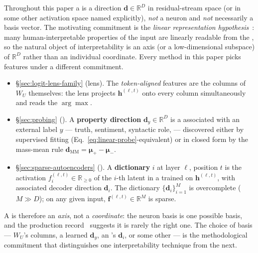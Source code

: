 Throughout this paper a \textbf{} is a direction
$\mathbf{d} \in \mathbb{R}^D$ in residual-stream space (or in some
other activation space named explicitly), \emph{not} a neuron and
\emph{not} necessarily a basis vector. The motivating commitment is
the \emph{linear representation hypothesis}~: many
human-interpretable properties of the input are linearly readable
from the , so the natural object of interpretability
is an axis (or a low-dimensional subspace) of $\mathbb{R}^D$ rather
than an individual coordinate. Every method in this paper picks
features under a different commitment.
\begin{itemize}
  \item \S\ref{sec:logit-lens-family} (lens). The \emph{token-aligned}
    features are the columns of $W_U$ themselves: the lens projects
    $\mathbf{h}^{(\ell, t)}$ onto every column simultaneously and
    reads the $\arg\max$.
  \item \S\ref{sec:probing} (). A \textbf{property direction}
    $\mathbf{d}_y \in \mathbb{R}^D$ is a  associated with an
    external label $y$ --- truth, sentiment, syntactic role,
     --- discovered either by supervised fitting
    (Eq.~\eqref{eq:linear-probe}-equivalent) or in closed form by the
    mass-mean rule
    $\mathbf{d}_{\mathrm{MM}} = \boldsymbol{\mu}_+ - \boldsymbol{\mu}_-$.
  \item \S\ref{sec:sparse-autoencoders} (). A \textbf{dictionary
    } $i$ at layer $\ell$, position $t$ is the activation
    $f_i^{(\ell, t)} \in \mathbb{R}_{\geq 0}$ of the $i$-th latent in
    a  trained on $\mathbf{h}^{(\ell, t)}$, with
    associated decoder direction $\mathbf{d}_i$. The dictionary
    $\{\mathbf{d}_i\}_{i=1}^M$ is overcomplete ($M \gg D$); on any
    given input, $\mathbf{f}^{(\ell, t)} \in \mathbb{R}^M$ is sparse.
\end{itemize}
A  is therefore an \emph{axis}, not a \emph{coordinate}: the
neuron basis is one possible  basis, and the production
record~ suggests it is rarely the right one. The choice of
basis --- $W_U$'s columns, a learned $\mathbf{d}_y$, an 's
$\mathbf{d}_i$, or some other --- is the methodological commitment
that distinguishes one interpretability technique from the next.

